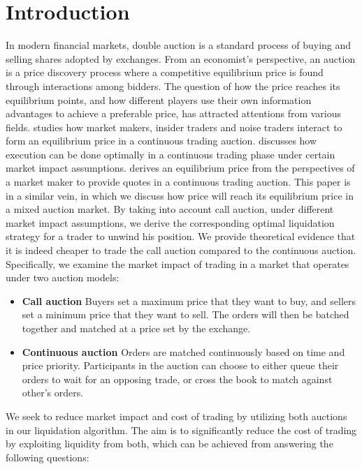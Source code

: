 
\section{Introduction}
In modern financial markets, double auction is a standard process of buying and selling shares adopted by exchanges. From an economist's perspective, an auction is a price discovery process where a competitive equilibrium price is found through interactions among bidders. The question of how the price reaches its equilibrium points, and how different players use their own information advantages to achieve a preferable price, has attracted attentions from various fields. \cite{Kyle1985} studies how market makers, insider traders and noise traders interact to form an equilibrium price in a continuous trading auction. \cite{Almgren2000} discusses how execution can be done optimally in a continuous trading phase under certain market impact assumptions. \cite{Avellaneda2008} derives an equilibrium price from the perspectives of a market maker to provide quotes in a continuous trading auction. This paper is in a similar vein, in which we discuss how price will reach its equilibrium price in a mixed auction market. By taking into account call auction, under different market impact assumptions, we derive the corresponding optimal liquidation strategy for a trader to unwind his position. We provide theoretical evidence that it is indeed cheaper to trade the call auction compared to the continuous auction. Specifically, we examine the market impact of trading in a market that operates under two auction models:

\begin{itemize}
  \item \textbf{Call auction} Buyers set a maximum price that they want to buy, and sellers set a minimum price that they want to sell. The orders will then be batched together and matched at a price set by the exchange.
  \item \textbf{Continuous auction} Orders are matched continuously based on time and price priority. Participants in the auction can choose to either queue their orders to wait for an opposing trade, or cross the book to match against other's orders.
\end{itemize}

We seek to reduce market impact and cost of trading by utilizing both auctions in our liquidation algorithm. The aim is to significantly reduce the cost of trading by exploiting liquidity from both, which can be achieved from answering the following questions:

